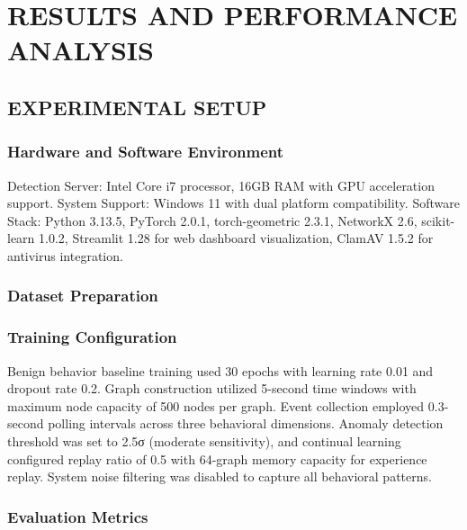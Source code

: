 

\chapter{RESULTS AND PERFORMANCE ANALYSIS}

\section{EXPERIMENTAL SETUP}

\subsection{Hardware and Software Environment}

Detection Server: Intel Core i7 processor, 16GB RAM with GPU acceleration support. System Support: Windows 11  with dual platform compatibility. Software Stack: Python 3.13.5, PyTorch 2.0.1, torch-geometric 2.3.1, NetworkX 2.6, scikit-learn 1.0.2, Streamlit 1.28 for web dashboard visualization, ClamAV 1.5.2 for antivirus integration.

\subsection{Dataset Preparation}

\subsection{Training Configuration}

Benign behavior baseline training used 30 epochs with learning rate 0.01 and dropout rate 0.2. Graph construction utilized 5-second time windows with maximum node capacity of 500 nodes per graph. Event collection employed 0.3-second polling intervals across three behavioral dimensions. Anomaly detection threshold was set to 2.5σ (moderate sensitivity), and continual learning configured replay ratio of 0.5 with 64-graph memory capacity for experience replay. System noise filtering was disabled to capture all behavioral patterns.

\subsection{Evaluation Metrics}

